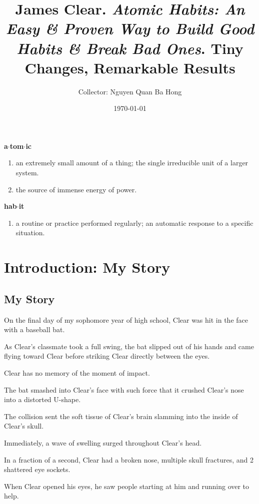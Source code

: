 \documentclass[oneside]{article}
\title{James Clear. \textit{Atomic Habits: An Easy \& Proven Way to Build Good Habits \& Break Bad Ones}. Tiny Changes, Remarkable Results}
\author{Collector: Nguyen Quan Ba Hong}
\date{\today}
\numberwithin{equation}{section}
\begin{document}
\maketitle
\setcounter{secnumdepth}{6}
\setcounter{tocdepth}{6}
\tableofcontents


\noindent\textbf{a$\cdot$tom$\cdot$ic}
\begin{enumerate}
    \item an extremely small amount of a thing; the single irreducible unit of a larger system.
    \item the source of immense energy of power.
\end{enumerate}
\textbf{hab$\cdot$it}
\begin{enumerate}
    \item a routine or practice performed regularly; an automatic response to a specific situation.
\end{enumerate}

\section*{Introduction: My Story}

\subsection*{My Story}
On the final day of my sophomore year of high school, Clear was hit in the face with a baseball bat.

As Clear's classmate took a full swing, the bat slipped out of his hands and came flying toward Clear before striking Clear directly between the eyes.

Clear has no memory of the moment of impact.

%
The bat smashed into Clear's face with such force that it crushed Clear's nose into a distorted U-shape.

The collision sent the soft tissue of Clear's brain slamming into the inside of Clear's skull.

Immediately, a wave of swelling surged throughout Clear's head.

In a fraction of a second, Clear had a broken nose, multiple skull fractures, and 2 shattered eye sockets.

%
When Clear opened his eyes, he saw people starting at him and running over to help.
\end{document}
